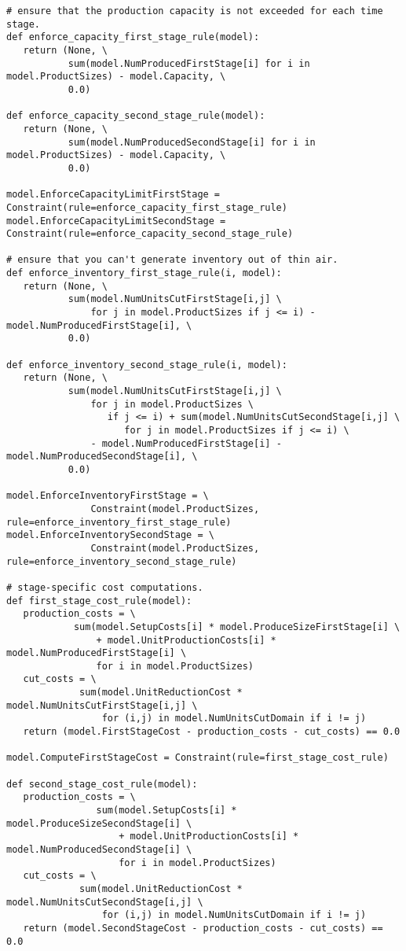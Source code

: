 {\begin{verbatim}
# ensure that the production capacity is not exceeded for each time stage.
def enforce_capacity_first_stage_rule(model):
   return (None, \
           sum(model.NumProducedFirstStage[i] for i in model.ProductSizes) - model.Capacity, \
           0.0)

def enforce_capacity_second_stage_rule(model):
   return (None, \
           sum(model.NumProducedSecondStage[i] for i in model.ProductSizes) - model.Capacity, \
           0.0)    

model.EnforceCapacityLimitFirstStage = Constraint(rule=enforce_capacity_first_stage_rule)
model.EnforceCapacityLimitSecondStage = Constraint(rule=enforce_capacity_second_stage_rule)

# ensure that you can't generate inventory out of thin air.
def enforce_inventory_first_stage_rule(i, model):
   return (None, \
           sum(model.NumUnitsCutFirstStage[i,j] \
               for j in model.ProductSizes if j <= i) - model.NumProducedFirstStage[i], \
           0.0)

def enforce_inventory_second_stage_rule(i, model):
   return (None, \
           sum(model.NumUnitsCutFirstStage[i,j] \
               for j in model.ProductSizes \
                  if j <= i) + sum(model.NumUnitsCutSecondStage[i,j] \
                     for j in model.ProductSizes if j <= i) \
               - model.NumProducedFirstStage[i] - model.NumProducedSecondStage[i], \
           0.0)

model.EnforceInventoryFirstStage = \
               Constraint(model.ProductSizes, rule=enforce_inventory_first_stage_rule)
model.EnforceInventorySecondStage = \
               Constraint(model.ProductSizes, rule=enforce_inventory_second_stage_rule)

# stage-specific cost computations.
def first_stage_cost_rule(model):
   production_costs = \
            sum(model.SetupCosts[i] * model.ProduceSizeFirstStage[i] \
                + model.UnitProductionCosts[i] * model.NumProducedFirstStage[i] \
                for i in model.ProductSizes)
   cut_costs = \
             sum(model.UnitReductionCost * model.NumUnitsCutFirstStage[i,j] \
                 for (i,j) in model.NumUnitsCutDomain if i != j)
   return (model.FirstStageCost - production_costs - cut_costs) == 0.0

model.ComputeFirstStageCost = Constraint(rule=first_stage_cost_rule)

def second_stage_cost_rule(model):
   production_costs = \
                sum(model.SetupCosts[i] * model.ProduceSizeSecondStage[i] \
                    + model.UnitProductionCosts[i] * model.NumProducedSecondStage[i] \
                    for i in model.ProductSizes)
   cut_costs = \
             sum(model.UnitReductionCost * model.NumUnitsCutSecondStage[i,j] \
                 for (i,j) in model.NumUnitsCutDomain if i != j)
   return (model.SecondStageCost - production_costs - cut_costs) == 0.0    


\end{verbatim}}
